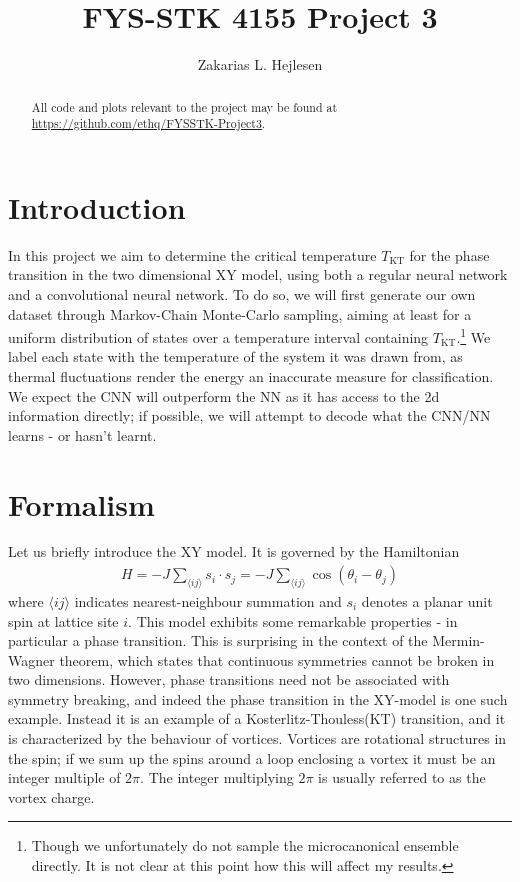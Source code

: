 \documentclass[]{article}
\title{FYS-STK 4155 Project 3}
\author{Zakarias L. Hejlesen}
\begin{document}
\maketitle

\begin{abstract}
	 All code and plots relevant to the project may be found at \url{https://github.com/ethq/FYSSTK-Project3}.
\end{abstract}

\section{Introduction}
In this project we aim to determine the critical temperature $T_\text{KT}$ for the phase transition in the two dimensional XY model, using both a regular neural network and a convolutional neural network. To do so, we will first generate our own dataset through Markov-Chain Monte-Carlo sampling, aiming at least for a uniform distribution of states over a temperature interval containing $T_\text{KT}$.\footnote{Though we unfortunately do not sample the microcanonical ensemble directly. It is not clear at this point how this will affect my results.} We label each state with the temperature of the system it was drawn from, as thermal fluctuations render the energy an inaccurate measure for classification. We expect the CNN will outperform the NN as it has access to the 2d information directly; if possible, we will attempt to decode what the CNN/NN learns - or hasn't learnt.

\section{Formalism}
Let us briefly introduce the XY model. It is governed by the Hamiltonian
\begin{align}
H = -J\sum_{\langle ij\rangle}s_i\cdot s_j = -J\sum_{\langle ij\rangle}\cos(\theta_i-\theta_j)
\end{align}
where $\langle ij \rangle$ indicates nearest-neighbour summation and $s_i$ denotes a planar unit spin at lattice site $i$. This model exhibits some remarkable properties - in particular a phase transition. This is surprising in the context of the Mermin-Wagner theorem\cite{PhysRevLett.17.1133}, which states that continuous symmetries cannot be broken in two dimensions. However, phase transitions need not be associated with symmetry breaking, and indeed the phase transition in the XY-model is one such example. Instead it is an example of a Kosterlitz-Thouless(KT) transition, and it is characterized by the behaviour of vortices. Vortices are rotational structures in the spin; if we sum up the spins around a loop enclosing a vortex it must be an integer multiple of $2\pi$. The integer multiplying $2\pi$ is usually referred to as the vortex charge.
\end{document}
